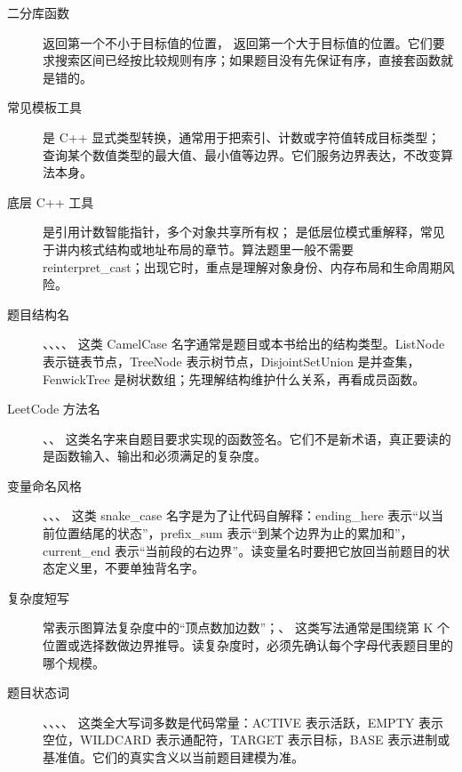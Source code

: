 \begin{description}
  \item[二分库函数]  返回第一个不小于目标值的位置， 返回第一个大于目标值的位置。它们要求搜索区间已经按比较规则有序；如果题目没有先保证有序，直接套函数就是错的。
  \item[常见模板工具]  是 C++ 显式类型转换，通常用于把索引、计数或字符值转成目标类型； 查询某个数值类型的最大值、最小值等边界。它们服务边界表达，不改变算法本身。
  \item[底层 C++ 工具]  是引用计数智能指针，多个对象共享所有权； 是低层位模式重解释，常见于讲内核式结构或地址布局的章节。算法题里一般不需要 reinterpret\_cast；出现它时，重点是理解对象身份、内存布局和生命周期风险。
  \item[题目结构名] 、、、、 这类 CamelCase 名字通常是题目或本书给出的结构类型。ListNode 表示链表节点，TreeNode 表示树节点，DisjointSetUnion 是并查集，FenwickTree 是树状数组；先理解结构维护什么关系，再看成员函数。
  \item[LeetCode 方法名] 、、 这类名字来自题目要求实现的函数签名。它们不是新术语，真正要读的是函数输入、输出和必须满足的复杂度。
  \item[变量命名风格] 、、、 这类 snake\_case 名字是为了让代码自解释：ending\_here 表示“以当前位置结尾的状态”，prefix\_sum 表示“到某个边界为止的累加和”，current\_end 表示“当前段的右边界”。读变量名时要把它放回当前题目的状态定义里，不要单独背名字。
  \item[复杂度短写]  常表示图算法复杂度中的“顶点数加边数”；、 这类写法通常是围绕第 K 个位置或选择数做边界推导。读复杂度时，必须先确认每个字母代表题目里的哪个规模。
  \item[题目状态词] 、、、、 这类全大写词多数是代码常量：ACTIVE 表示活跃，EMPTY 表示空位，WILDCARD 表示通配符，TARGET 表示目标，BASE 表示进制或基准值。它们的真实含义以当前题目建模为准。
\end{description}
